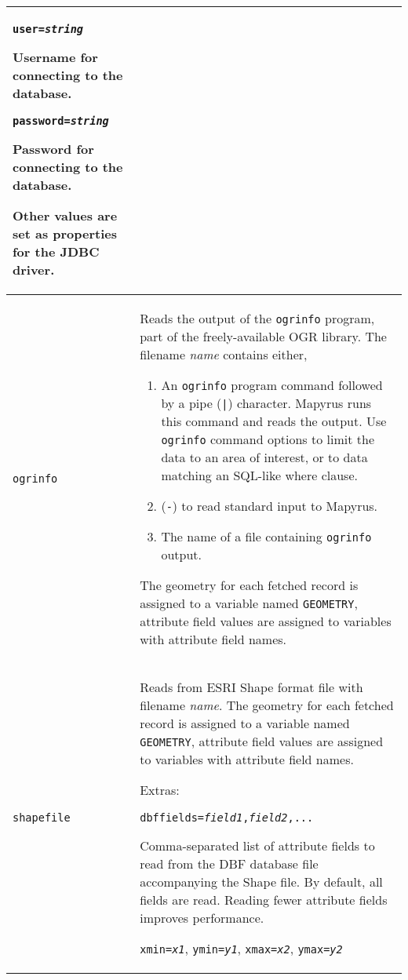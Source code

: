 \begin{longtable}{|p{3cm}|p{10cm}|}
\vspace{10pt}
\texttt{user=\textit{string}}

Username for connecting to the database.

\vspace{10pt}
\texttt{password=\textit{string}}

Password for connecting to the database.

\vspace{10pt}
Other values are set as properties for the JDBC driver. \\

\hline

\texttt{ogrinfo} &
Reads the output of the \texttt{ogrinfo} program, part of
the freely-available OGR library.
The filename \textit{name} contains either,
\begin{enumerate}
\item
An \texttt{ogrinfo} program command followed by a pipe (\texttt{|}) character.
Mapyrus runs this command and reads the output.  Use \texttt{ogrinfo}
command options to limit the data to an area of interest, or to data
matching an SQL-like where clause.
\item
(\texttt{-}) to read standard input to Mapyrus.
\item
The name of a file containing \texttt{ogrinfo} output.
\end{enumerate}

The geometry for each fetched record is assigned to a variable named
\texttt{GEOMETRY}, attribute field values are assigned to
variables with attribute field names. \\

\hline

\texttt{shapefile} &
Reads from ESRI Shape format file with filename \textit{name}.
The geometry for each fetched record is assigned to a variable named
\texttt{GEOMETRY}, attribute field values are assigned to
variables with attribute field names.

\vspace{10pt}
Extras:

\texttt{dbffields=\textit{field1},\textit{field2},...}

Comma-separated list of
attribute fields to read from the DBF database file accompanying the
Shape file.  By default, all fields are read.  Reading fewer attribute
fields improves performance.

\vspace{10pt}
\texttt{xmin=\textit{x1}},
\texttt{ymin=\textit{y1}},
\texttt{xmax=\textit{x2}},
\texttt{ymax=\textit{y2}}


\end{longtable}
